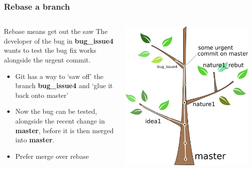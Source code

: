 \documentclass{beamer}
\begin{document}
\begin{frame}
  \frametitle{Rebase a branch}
  \begin{columns}[T]
    \begin{column}{.5\textwidth}
      \begin{block}{Rebase means get out the saw}
        The developer of the bug in \textbf{bug\_issue4} wants to test the bug
        fix works alongside the urgent commit.
        \begin{itemize}
          \item Git has a way to `saw off' the branch  \textbf{bug\_issue4}
            and `glue it back onto master'
          \item Now the bug can be tested, alongside the recent change in
            \textbf{master}, before it is then merged into \textbf{master}.
            \item Prefer merge over rebase
        \end{itemize}
      \end{block}
    \end{column}
    \begin{column}{.5\textwidth}
      \includegraphics[width=\textwidth]{tree_rebase3.png}
    \end{column}
  \end{columns}
\end{frame}
\end{document}

